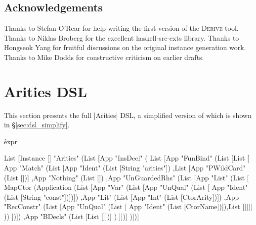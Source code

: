 \documentclass{llncs}
\newcommand{\derive}{\textsc{Derive}}
\begin{document}
\subsection*{Acknowledgements}

Thanks to Stefan O'Rear for help writing the first version of the \derive{} tool. Thanks to Niklas Broberg for the excellent haskell-src-exts library. Thanks to Hongseok Yang for fruitful discussions on the original instance generation work. Thanks to Mike Dodds for constructive criticism on earlier drafts.

\appendix

\section{Arities DSL}
\label{sec:arities_full}

This section presents the full |Arities| DSL, a simplified version of which is shown in \S\ref{sec:dsl_simplify}.

\h{expr}\begin{code}
List [Instance [] "Arities" (List [App "InsDecl" (
    List [App "FunBind" (List [List [
        App "Match" (List
            [App "Ident" (List [String "arities"])
            ,List [App "PWildCard" (List [])]
            ,App "Nothing" (List [])
            ,App "UnGuardedRhs" (List [App "List" (List [
                MapCtor (Application (List
                    [App "Var" (List [App "UnQual" (List [
                        App "Ident" (List [String "const"])])])
                    ,App "Lit" (List [App "Int" (List [CtorArity])])
                    ,App "RecConstr" (List [App "UnQual" (List [
                        App "Ident" (List [CtorName])]),List []])]
                ))
            ])])
            ,App "BDecls" (List [List []])]
        )
    ]])]
)])]
\end{code}


\balance

\end{document}
